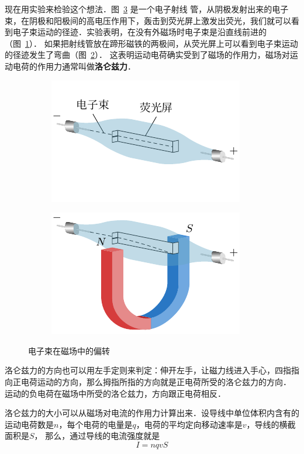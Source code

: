 现在用实验来检验这个想法．图~\ref{fig_C_1-34} 是一个电子射线
管，从阴极发射出来的电子束，在阴极和阳极间的高电压作用下，轰击到荧光屏上激发出荧光，我们就可以看到电子束运动的径迹．实验表明，在没有外磁场时电子束是沿直线前进的（图~\ref{fig_C_1-34a}）．
如果把射线管放在蹄形磁铁的两极间，从荧光屏上可以看到电子束运动的径迹发生了弯曲（图~\ref{fig_C_1-34b}）． 这表明运动电荷确实受到了磁场的作用力，磁场对运动电荷的作用力通常叫做\textbf{洛仑兹力}．
\begin{figure}[htbp]
	\centering
	\begin{subfigure}{0.4\linewidth}
		\centering
		\includegraphics{fig/C/1-34a.pdf}
		\caption{}\label{fig_C_1-34a}
	\end{subfigure}
	\hfil
	\begin{subfigure}{0.4\linewidth}
		\centering
		\includegraphics{fig/C/1-34b.pdf}
		\caption{}\label{fig_C_1-34b}
	\end{subfigure}
	\caption{电子束在磁场中的偏转}\label{fig_C_1-34}
\end{figure}


洛仑兹力的方向也可以用左手定则来判定：伸开左手，让磁力线进入手心，四指指向正电荷运动的方向，那么拇指所指的方向就是正电荷所受的洛仑兹力的方向．
运动的负电荷在磁场中所受的洛仑兹力，方向跟正电荷相反．

洛仑兹力的大小可以从磁场对电流的作用力计算出来．设导线中单位体积内含有的运动电荷数是$n$，每个电荷的电量是$q$，电荷的平均定向移动速率是$v$，导线的横截面积是$S$，
那么，通过导线的电流强度就是
\[I=nqvS\]

